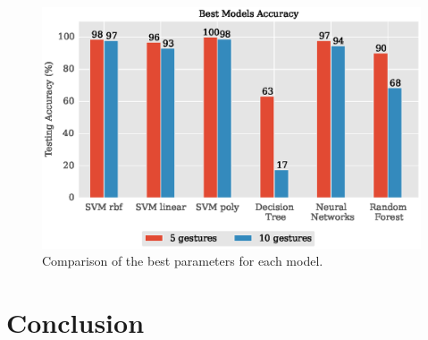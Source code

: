 \documentclass{article}
\begin{document}
\begin{figure}[t]
\vskip 0.2in
\begin{center}
\centerline{\includegraphics[width=\columnwidth]{allModels_comparison.eps}}
\caption{Comparison of the best parameters for each model.}
\label{fig:allModels_comparison}
\end{center}
\vskip -0.2in
\end{figure}

\section{Conclusion}



\end{document}
